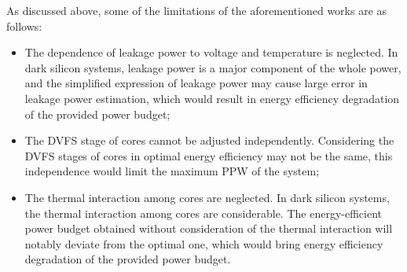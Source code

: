 As discussed above, some of the limitations of the aforementioned works are as follows:
\begin{itemize}  
\item The dependence of leakage power to voltage and temperature is neglected. In dark silicon systems, leakage power is a major component of the whole power, and the simplified expression of leakage power may cause large error in leakage power estimation, which would result in energy efficiency degradation of the provided power budget;
\item The DVFS stage of cores cannot be adjusted independently. Considering the DVFS stages of cores in optimal energy efficiency may not be the same, this independence would limit the maximum PPW of the system;
\item The thermal interaction among cores are neglected. In dark silicon systems, the thermal interaction among cores are considerable. The energy-efficient power budget obtained without consideration of the thermal interaction will notably deviate from the optimal one, which would bring energy efficiency degradation of the provided power budget.
\end{itemize} 

